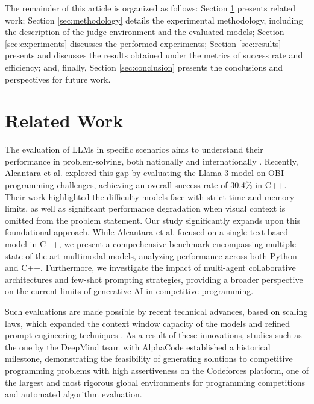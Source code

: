 \documentclass[conference]{IEEEtran}
\begin{document}
The remainder of this article is organized as follows: Section \ref{sec:related} presents related work; Section \ref{sec:methodology} details the experimental methodology, including the description of the judge environment and the evaluated models; Section \ref{sec:experiments} discusses the performed experiments; Section \ref{sec:results} presents and discusses the results obtained under the metrics of success rate and efficiency; and, finally, Section \ref{sec:conclusion} presents the conclusions and perspectives for future work.

\section{Related Work}\label{sec:related}

The evaluation of LLMs in specific scenarios aims to understand their performance in problem-solving, both nationally and internationally \cite{chen2021evaluating, mendonca2024evaluating, viegas2025assessing, huang2024competition, zheng2025livecodebench, li2024evaluating, almeida2023bluex}. Recently, Alcantara et al. \cite{alcantara2025assessing} explored this gap by evaluating the Llama 3 model on OBI programming challenges, achieving an overall success rate of 30.4\% in C++. Their work highlighted the difficulty models face with strict time and memory limits, as well as significant performance degradation when visual context is omitted from the problem statement. Our study significantly expands upon this foundational approach. While Alcantara et al. focused on a single text-based model in C++, we present a comprehensive benchmark encompassing multiple state-of-the-art multimodal models, analyzing performance across both Python and C++. Furthermore, we investigate the impact of multi-agent collaborative architectures and few-shot prompting strategies, providing a broader perspective on the current limits of generative AI in competitive programming.

Such evaluations are made possible by recent technical advances, based on scaling laws, which expanded the context window capacity of the models and refined prompt engineering techniques \cite{kaplan2020scaling, touvron2023llama, dair2025prompt, wei2021finetuned, brown2020language}. As a result of these innovations, studies such as the one by the DeepMind team with AlphaCode \cite{li2022competition} established a historical milestone, demonstrating the feasibility of generating solutions to competitive programming problems with high assertiveness on the Codeforces platform, one of the largest and most rigorous global environments for programming competitions and automated algorithm evaluation.
\end{document}
